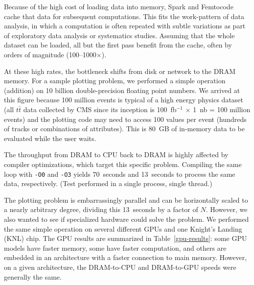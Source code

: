 \documentclass[12pt]{article}
\begin{document}
Because of the high cost of loading data into memory, Spark and Femtocode cache that data for subsequent computations. This fits the work-pattern of data analysis, in which a computation is often repeated with subtle variations as part of exploratory data analysis or systematics studies. Assuming that the whole dataset can be loaded, all but the first pass benefit from the cache, often by orders of magnitude (100--1000$\times$).

At these high rates, the bottleneck shifts from disk or network to the DRAM memory. For a sample plotting problem, we performed a simple operation (addition) on 10 billion double-precision floating point numbers. We arrived at this figure because 100 million events is typical of a high energy physics dataset (all $t\bar{t}$ data collected by CMS since its inception is 100~fb$^{-1}$ $\times$ 1~nb = 100 million events) and the plotting code may need to access 100 values per event (hundreds of tracks or combinations of attributes). This is 80~GB of in-memory data to be evaluated while the user waits.

The throughput from DRAM to CPU back to DRAM is highly affected by compiler optimizations, which target this specific problem. Compiling the same loop with {\tt -O0} and {\tt -O3} yields 70~seconds and 13~seconds to process the same data, respectively. (Test performed in a single process, single thread.)

The plotting problem is embarrassingly parallel and can be horizontally scaled to a nearly arbitrary degree, dividing this 13~seconds by a factor of $N$. However, we also wanted to see if specialized hardware could solve the problem. We performed the same simple operation on several different GPUs and one Knight's Landing (KNL) chip. The GPU results are summarized in Table~\ref{gpu-results}: some GPU models have faster memory, some have faster computation, and others are embedded in an architecture with a faster connection to main memory. However, on a given architecture, the DRAM-to-CPU and DRAM-to-GPU speeds were generally the same.
\end{document}
